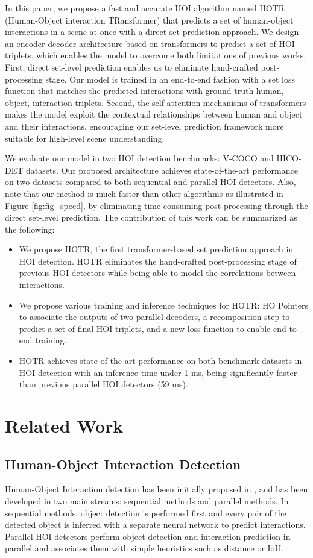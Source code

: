 \documentclass[final]{cvpr}
\begin{document}
In this paper, we propose a fast and accurate HOI algorithm named HOTR (Human-Object interaction TRansformer) that predicts a set of human-object interactions in a scene at once with a direct set prediction approach.
We design an encoder-decoder architecture based on transformers to predict a set of HOI triplets, which enables the model to overcome both limitations of previous works.
First, direct set-level prediction enables us to eliminate hand-crafted post-processing stage.
Our model is trained in an end-to-end fashion with a set loss function that matches the predicted interactions with ground-truth human, object, interaction triplets.
Second, the self-attention mechanisms of transformers makes the model exploit the contextual relationships between human and object and their interactions, encouraging our set-level prediction framework more suitable for high-level scene understanding.

We evaluate our model in two HOI detection benchmarks: V-COCO and HICO-DET datasets.
Our proposed architecture achieves state-of-the-art performance on two datasets compared to both sequential and parallel HOI detectors.
Also, note that our method is much faster than other algorithms as illustrated in Figure \ref{fig:fig_speed}, by eliminating time-consuming post-processing through the direct set-level prediction.
The contribution of this work can be summarized as the following:
\begin{itemize}
    \item We propose HOTR, the first transformer-based set prediction approach in HOI detection. HOTR eliminates the hand-crafted post-processing stage of previous HOI detectors while being able to model the correlations between interactions.
    \item We propose various training and inference techniques for HOTR: HO Pointers to associate the outputs of two parallel decoders, a recomposition step to predict a set of final HOI triplets, and a new loss function to enable end-to-end training.
\item HOTR achieves state-of-the-art performance on both benchmark datasets in HOI detection with an inference time under 1 ms, being significantly faster than previous parallel HOI detectors (59 ms).
\end{itemize} \section{Related Work}
\subsection{Human-Object Interaction Detection}
\label{subsec:HOI}
Human-Object Interaction detection has been initially proposed in \cite{gupta2015visual}, and has been developed in two main streams: sequential methods and parallel methods.
In sequential methods, object detection is performed first and every pair of the detected object is inferred with a separate neural network to predict interactions.
Parallel HOI detectors perform object detection and interaction prediction in parallel and associates them with simple heuristics such as distance or IoU.
\newline
\end{document}
